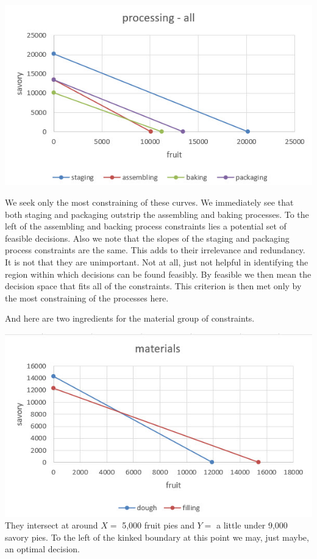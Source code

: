 \documentclass[
]{book}
\begin{document}
\includegraphics{images/03/pie-2-product-process-all.jpg}

We seek only the most constraining of these curves. We immediately see that both staging and packaging outstrip the assembling and baking processes. To the left of the assembling and backing process constraints lies a potential set of feasible decisions. Also we note that the slopes of the staging and packaging process constraints are the same. This adds to their irrelevance and redundancy. It is not that they are unimportant. Not at all, just not helpful in identifying the region within which decisions can be found feasibly. By feasible we then mean the decision space that fits all of the constraints. This criterion is then met only by the most constraining of the processes here.

And here are two ingredients for the material group of constraints.

\includegraphics{images/03/pie-2-product-material.jpg}
They intersect at around \(X=\) 5,000 fruit pies and \(Y=\) a little under 9,000 savory pies. To the left of the kinked boundary at this point we may, just maybe, an optimal decision.
\end{document}
